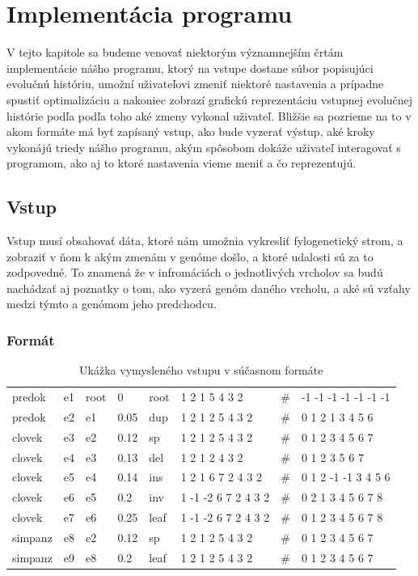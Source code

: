 \chapter{Implementácia programu}
V tejto kapitole sa budeme venovať niektorým významnejším črtám implementácie nášho programu, ktorý na vstupe dostane súbor popisujúci evolučnú históriu,
umožní uživateľovi zmeniť niektoré nastavenia a prípadne spustiť optimalizáciu a nakoniec zobrazí grafickú reprezentáciu vstupnej evolučnej histórie podľa
podľa toho aké zmeny vykonal uživateľ. Bližšie sa pozrieme na to v akom formáte má byť zapísaný vstup, ako bude vyzerať výstup, aké kroky vykonájú triedy nášho programu,
akým spôsobom dokáže uživateľ interagovať s programom,
ako aj to ktoré nastavenia vieme meniť a čo reprezentujú.
\section{Vstup}
\label{sec:vstup}
Vstup musí obsahovať dáta, ktoré nám umožnia vykresliť fylogenetický strom, a zobraziť v ňom k akým zmenám v genóme došlo, a ktoré udalosti sú za to zodpovedné.
To znamená že v infromáciách o jednotlivých vrcholov sa budú nachádzať aj poznatky o tom, ako vyzerá genóm daného vrcholu, a aké sú vzťahy medzi týmto a genómom jeho predchodcu.
\subsection{Formát}


\begin{table}[!htb]
\label{tab:vstup}
\begin{center}
\begin{tabular}{llllllll}
predok & e1 & root & 0 & root & 1 2 1 5 4 3 2 & \#  & -1 -1 -1 -1 -1 -1 -1 \\
predok & e2 & e1 &  0.05 & dup &  1 2 1 2 5 4 3 2 & \# & 0 1 2 1 3 4 5 6 \\
clovek & e3 & e2 &  0.12 & sp &   1 2 1 2 5 4 3 2 & \# & 0 1 2 3 4 5 6 7 \\
clovek & e4 & e3 &  0.13 & del & 1 2 1 2 4 3 2 & \# & 0 1 2 3 5 6 7 \\
clovek & e5 & e4 &  0.14 & ins & 1 2 1 6 7 2 4 3 2 & \# & 0 1 2 -1 -1 3 4 5 6 \\
clovek &  e6 & e5 &  0.2 & inv &  1 -1 -2 6 7 2 4 3 2 & \# & 0 2 1 3 4 5 6 7 8 \\
clovek & e7 & e6 &  0.25 & leaf & 1 -1 -2 6 7 2 4 3 2 & \# & 0 1 2 3 4 5 6 7 8 \\
simpanz & e8 & e2  & 0.12 & sp &  1 2 1 2 5 4 3 2 & \# & 0 1 2 3 4 5 6 7 \\
simpanz & e9 & e8 &  0.2 & leaf & 1 2 1 2 5 4 3 2 & \# & 0 1 2 3 4 5 6 7 \\
 \end{tabular}

\end{center}
\caption{Ukážka vymysleného vstupu v súčasnom formáte \cite{biowiki}}
\end{table}

